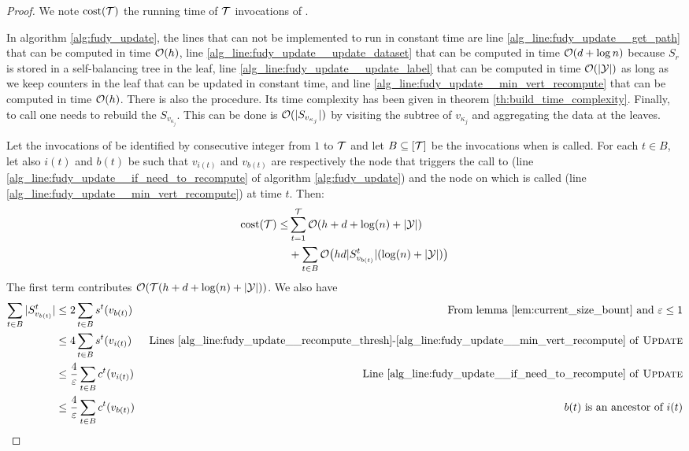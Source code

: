 \begin{proof}
    We note $\text{cost}(\mathcal{T})$ the running time of $\mathcal{T}$ invocations of \AlgoUpdate{}.

    In algorithm \ref{alg:fudy_update}, the lines that can not be implemented to run in constant time are line \ref{alg_line:fudy_update__get_path} that can be computed in time $\mathcal{O}(h)$, line \ref{alg_line:fudy_update__update_dataset} that can be computed in time $\mathcal{O}(d + \log n)$ because $S_r$ is stored in a self-balancing tree in the leaf, line \ref{alg_line:fudy_update__update_label} that can be computed in time $\mathcal{O}(|\mathcal{Y}|)$ as long as we keep counters in the leaf that can be updated in constant time, and line \ref{alg_line:fudy_update__min_vert_recompute} that can be computed in time $\mathcal{O}(h)$. There is also the \AlgoBuild{} procedure. Its time complexity has been given in theorem \ref{th:build_time_complexity}. Finally, to call \AlgoBuild{} one needs to rebuild the $S_{v_{\kappa_j}}$. This can be done is $\mathcal{O}(|S_{v_{\kappa_j}}|)$ by visiting the subtree of $v_{\kappa_j}$ and aggregating the data at the leaves. 

    Let the invocations of \AlgoUpdate{} be identified by consecutive integer from $1$ to $\mathcal{T}$ and let $B \subseteq [\mathcal{T}]$ be the invocations when \AlgoBuild{} is called. For each $t\in B$, let also $i(t)$ and $b(t)$ be such that $v_{i(t)}$ and $v_{b(t)}$ are respectively the node that triggers the call to \AlgoBuild{} (line \ref{alg_line:fudy_update__if_need_to_recompute} of algorithm \ref{alg:fudy_update}) and the node on which \AlgoBuild{} is called (line \ref{alg_line:fudy_update__min_vert_recompute}) at time $t$. Then:
    \begin{equation*}
        \begin{split}
            \text{cost}(\mathcal{T}) \leq &\sum_{t=1}^{\mathcal{T}} \mathcal{O}(h + d + \log(n) + |\mathcal{Y}|)\\
            & + \sum_{t \in B} \mathcal{O}\big(hd|S_{v_{b(t)}}^t|(\log(n) + |\mathcal{Y}|)\big)
        \end{split}
    \end{equation*}
    The first term contributes $\mathcal{O}(\mathcal{T}(h + d + \log(n) + |\mathcal{Y}|))$. We also have
    \begin{align*}
        \sum_{t\in B}|S_{v_{b(t)}}^t| & \leq 2 \sum_{t\in B} s^t(v_{b(t)}) &\text{ From lemma \ref{lem:current_size_bount} and $\varepsilon \leq 1$}\\
        & \leq 4 \sum_{t\in B} s^t(v_{i(t)}) & \text{ Lines \ref{alg_line:fudy_update__recompute_thresh}-\ref{alg_line:fudy_update__min_vert_recompute} of \textsc{Update}{}}\\
        & \leq \frac{4}{\varepsilon} \sum_{t\in B} c^t(v_{i(t)}) & \text{ Line \ref{alg_line:fudy_update__if_need_to_recompute} of \textsc{Update}{}}\\
        & \leq \frac{4}{\varepsilon} \sum_{t\in B} c^t(v_{b(t)}) & \text{ $b(t)$ is an ancestor of $i(t)$}
    \end{align*}


\end{proof}
